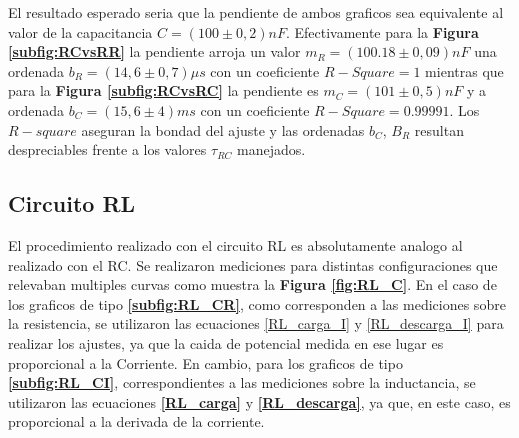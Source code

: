 \documentclass[11pt,a4paper]{article}
\begin{document}
El resultado esperado seria que la pendiente de ambos graficos sea equivalente al valor de la capacitancia $C = (100 \pm 0,2)nF$. Efectivamente para la \textbf{Figura \ref{subfig:RCvsRR}} la pendiente arroja un valor $m_{R} = (100.18 \pm 0,09)nF$ una ordenada $b_R = (14,6 \pm 0,7)\mu s$ con un coeficiente $R-Square = 1$ mientras que para la \textbf{Figura \ref{subfig:RCvsRC}} la pendiente es $m_{C} = (101 \pm 0,5)nF$ y a ordenada $b_C = (15,6 \pm 4)ms$ con un coeficiente $R-Square = 0.99991$. Los $R-square$ aseguran la bondad del ajuste y las ordenadas $b_C$, $B_R$ resultan despreciables frente a los valores $\tau_{RC}$ manejados. 


\subsection{Circuito RL}

El procedimiento realizado con el circuito RL es absolutamente analogo al realizado con el RC. Se realizaron mediciones para distintas configuraciones que relevaban multiples curvas como muestra la \textbf{Figura \ref{fig:RL_C}}. En el caso de los graficos de tipo \textbf{\ref{subfig:RL_CR}}, como corresponden a las mediciones sobre la resistencia, se utilizaron las ecuaciones \eqref{RL_carga_I} y \eqref{RL_descarga_I} para realizar los ajustes, ya que la caida de potencial medida en ese lugar es proporcional a la Corriente. En cambio, para los graficos de tipo \textbf{\ref{subfig:RL_CI}}, correspondientes a las mediciones sobre la inductancia, se utilizaron las ecuaciones \textbf{\ref{RL_carga}} y \textbf{\ref{RL_descarga}}, ya que, en este caso, es proporcional a la derivada de la corriente.
\end{document}
